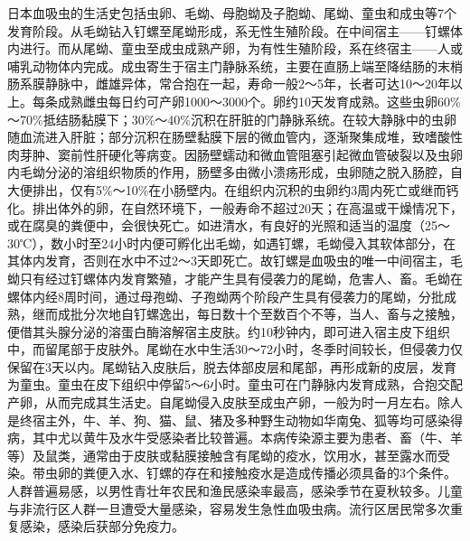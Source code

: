 日本血吸虫的生活史包括虫卵、毛蚴、母胞蚴及子胞蚴、尾蚴、童虫和成虫等7个发育阶段。从毛蚴钻入钉螺至尾蚴形成，系无性生殖阶段。在中间宿主------钉螺体内进行。而从尾蚴、童虫至成虫成熟产卵，为有性生殖阶段，系在终宿主------人或哺乳动物体内完成。成虫寄生于宿主门静脉系统，主要在直肠上端至降结肠的末梢肠系膜静脉中，雌雄异体，常合抱在一起，寿命一般2～5年，长者可达10～20年以上。每条成熟雌虫每日约可产卵1000～3000个。卵约10天发育成熟。这些虫卵60\%～70\%抵结肠黏膜下；30\%～40\%沉积在肝脏的门静脉系统。在较大静脉中的虫卵随血流进入肝脏；部分沉积在肠壁黏膜下层的微血管内，逐渐聚集成堆，致嗜酸性肉芽肿、窦前性肝硬化等病变。因肠壁蠕动和微血管阻塞引起微血管破裂以及虫卵内毛蚴分泌的溶组织物质的作用，肠壁多由微小溃疡形成，虫卵随之脱入肠腔，自大便排出，仅有5\%～10\%在小肠壁内。在组织内沉积的虫卵约3周内死亡或继而钙化。排出体外的卵，在自然环境下，一般寿命不超过20天；在高温或干燥情况下，或在腐臭的粪便中，会很快死亡。如进清水，有良好的光照和适当的温度（25～30℃），数小时至24小时内便可孵化出毛蚴，如遇钉螺，毛蚴侵入其软体部分，在其体内发育，否则在水中不过2～3天即死亡。故钉螺是血吸虫的唯一中间宿主，毛蚴只有经过钉螺体内发育繁殖，才能产生具有侵袭力的尾蚴，危害人、畜。毛蚴在螺体内经8周时间，通过母孢蚴、子孢蚴两个阶段产生具有侵袭力的尾蚴，分批成熟，继而成批分次地自钉螺逸出，每日数十个至数百个不等，当人、畜与之接触，便借其头腺分泌的溶蛋白酶溶解宿主皮肤。约10秒钟内，即可进入宿主皮下组织中，而留尾部于皮肤外。尾蚴在水中生活30～72小时，冬季时间较长，但侵袭力仅保留在3天以内。尾蚴钻入皮肤后，脱去体部皮层和尾部，再形成新的皮层，发育为童虫。童虫在皮下组织中停留5～6小时。童虫可在门静脉内发育成熟，合抱交配产卵，从而完成其生活史。自尾蚴侵入皮肤至成虫产卵，一般为时一月左右。除人是终宿主外，牛、羊、狗、猫、鼠、猪及多种野生动物如华南兔、狐等均可感染得病，其中尤以黄牛及水牛受感染者比较普遍。本病传染源主要为患者、畜（牛、羊等）及鼠类，通常由于皮肤或黏膜接触含有尾蚴的疫水，饮用水，甚至露水而受染。带虫卵的粪便入水、钉螺的存在和接触疫水是造成传播必须具备的3个条件。人群普遍易感，以男性青壮年农民和渔民感染率最高，感染季节在夏秋较多。儿童与非流行区人群一旦遭受大量感染，容易发生急性血吸虫病。流行区居民常多次重复感染，感染后获部分免疫力。


